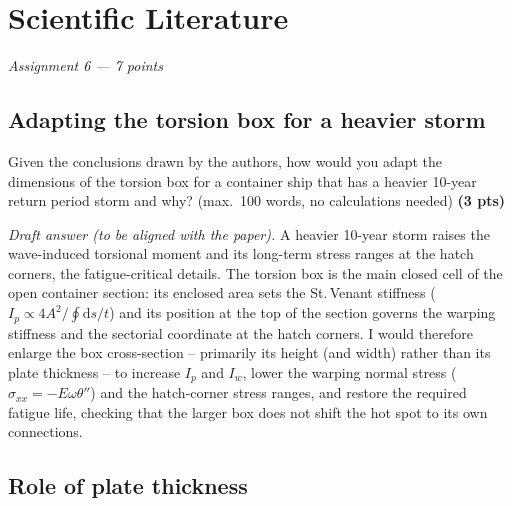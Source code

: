 \chapter{Scientific Literature}
\label{ch:assignment6}

\begingroup\itshape Assignment 6 --- 7 points\endgroup

\bigskip
\noindent{}

\section{Adapting the torsion box for a heavier storm}

Given the conclusions drawn by the authors, how would you adapt the dimensions of the torsion box for a container ship that has a heavier 10-year return period storm and why? (max.\ 100 words, no calculations needed) \textbf{(3 pts)}

\bigskip
\emph{Draft answer (to be aligned with the paper).} A heavier 10-year storm raises the wave-induced torsional moment and its long-term stress ranges at the hatch corners, the fatigue-critical details. The torsion box is the main closed cell of the open container section: its enclosed area sets the St.\,Venant stiffness ($I_p\propto4A^2/\oint\mathrm{d}s/t$) and its position at the top of the section governs the warping stiffness and the sectorial coordinate at the hatch corners. I would therefore enlarge the box cross-section -- primarily its height (and width) rather than its plate thickness -- to increase $I_p$ and $I_w$, lower the warping normal stress ($\sigma_{xx}=-E\omega\theta''$) and the hatch-corner stress ranges, and restore the required fatigue life, checking that the larger box does not shift the hot spot to its own connections.

\section{Role of plate thickness}

